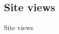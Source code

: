 \documentclass{beamer}
\begin{document}
\subsection{Site views}

\begin{frame}{Site views}

\end{frame}

    
\end{document}
